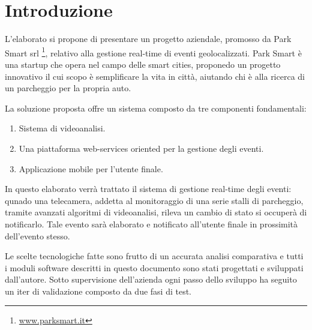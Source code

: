 \chapter{Introduzione}
L'elaborato si propone di presentare un progetto aziendale, promosso da Park Smart srl \footnote{\href{http://www.parksmart.it}{www.parksmart.it}}, relativo alla gestione real-time di eventi geolocalizzati. Park Smart è una startup che opera nel campo delle smart cities, proponedo un progetto innovativo il cui scopo è semplificare la vita in citt\`a, aiutando chi \`e alla ricerca di un parcheggio per la propria auto. 

La soluzione proposta offre un sistema composto da tre componenti fondamentali:

\begin{enumerate}
\item Sistema di videoanalisi.
\item Una piattaforma web-services oriented per 
la gestione degli eventi.
\item Applicazione mobile per l'utente finale.
\end{enumerate}

In questo elaborato verrà trattato il sistema di gestione real-time degli eventi: qunado una telecamera, addetta al monitoraggio di una serie stalli di parcheggio, tramite avanzati algoritmi di videoanalisi, rileva un cambio di stato si occuper\`a di notificarlo. Tale evento sarà elaborato e notificato all'utente finale in prossimit\`a dell'evento stesso. 

Le scelte tecnologiche fatte sono frutto di un accurata analisi comparativa e tutti i moduli software descritti in questo documento sono stati progettati e sviluppati dall'autore. Sotto supervisione dell'azienda ogni passo dello sviluppo ha seguito un iter di validazione composto da due fasi di test.
